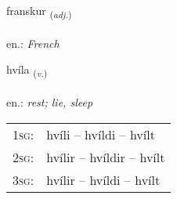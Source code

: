 \documentclass[frontgrid, backgrid]{flacards}\usepackage[]{graphicx}\usepackage[]{xcolor}
\begin{document}
\renewcommand{\flhead}{\vskip5pt \fboxsep=0pt {\small\bfseries\footnotesize Lýsingarorð | Adjective}}
\renewcommand{\fcfoot}{\vskip5pt \fboxsep=0pt \hspace{2pt}{\small\bfseries\footnotesize 2K}}

\renewcommand{\blhead}{\vskip5pt {\small\bfseries\footnotesize Lýsingarorð | Adjective }}
\renewcommand{\bcfoot}{\vskip5pt \hspace{2pt}{\small\bfseries\footnotesize 2K}}


{franskur \small{\textsubscript{(\textit{adj.})}} \\[1ex] %
\textphonetic{[franskʏr]} \\
en.: \emph{French} \\  [2ex]
\renewcommand*{\arraystretch}{0.8}
}

\renewcommand{\flhead}{\vskip5pt \fboxsep=0pt {\small\bfseries\footnotesize Sagnorð | Verb}}
\renewcommand{\fcfoot}{\vskip5pt \fboxsep=0pt \hspace{2pt}{\small\bfseries\footnotesize 2K}}

\renewcommand{\blhead}{\vskip5pt {\small\bfseries\footnotesize Sagnorð | Verb }}
\renewcommand{\bcfoot}{\vskip5pt \hspace{2pt}{\small\bfseries\footnotesize 2K}}


{hvíla \small{\textsubscript{(\textit{v.})}} \\[1ex] %
\textphonetic{[kʰviːla]} \\
en.: \emph{rest; lie, sleep} \\  [2ex]
\renewcommand*{\arraystretch}{0.8}
\begin{tabular}{p{1cm}l}
\textsc{1sg}: & hvíli -- hvíldi -- hvílt \\ 
\textsc{2sg}: & hvílir -- hvíldir -- hvílt \\ 
\textsc{3sg}: & hvílir -- hvíldi -- hvílt \\ 
\end{tabular}
}
\end{document}
